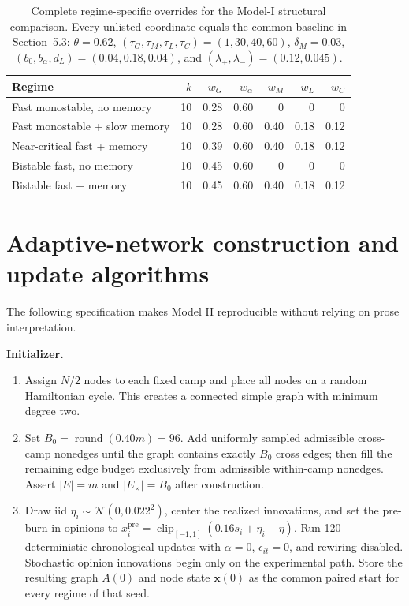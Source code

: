 \documentclass[10pt,a4paper]{article}
\newcommand{\inlinehead}[1]{\par\smallskip\noindent\textbf{#1}\ }
\begin{document}
\begin{appendices}
\begin{table}[!htbp]
\centering
\caption{Complete regime-specific overrides for the Model-I structural comparison. Every unlisted coordinate equals the common baseline in Section~5.3: $\theta=0.62$, $(\tau_G,\tau_M,\tau_L,\tau_C)=(1,30,40,60)$, $\delta_M=0.03$, $(b_0,b_\alpha,d_L)=(0.04,0.18,0.04)$, and $(\lambda_+,\lambda_-)=(0.12,0.045)$.}
\label{tab:model-i-regime-parameters}
\footnotesize
\setlength{\tabcolsep}{3pt}
\begin{tabular}{|p{4.0cm}|r|r|r|r|r|r|}
\hline
\textbf{Regime} & $k$ & $w_G$ & $w_\alpha$ & $w_M$ & $w_L$ & $w_C$\\
\hline
Fast monostable, no memory & 10 & 0.28 & 0.60 & 0 & 0 & 0\\
\hline
Fast monostable + slow memory & 10 & 0.28 & 0.60 & 0.40 & 0.18 & 0.12\\
\hline
Near-critical fast + memory & 10 & 0.39 & 0.60 & 0.40 & 0.18 & 0.12\\
\hline
Bistable fast, no memory & 10 & 0.45 & 0.60 & 0 & 0 & 0\\
\hline
Bistable fast + memory & 10 & 0.45 & 0.60 & 0.40 & 0.18 & 0.12\\
\hline
\end{tabular}
\end{table}

\section{Adaptive-network construction and update algorithms}

The following specification makes Model II reproducible without relying on prose interpretation.

\inlinehead{Initializer.}
\begin{enumerate}
  \item Assign $N/2$ nodes to each fixed camp and place all nodes on a random Hamiltonian cycle. This creates a connected simple graph with minimum degree two.
  \item Set $B_0=\operatorname{round}(0.40m)=96$. Add uniformly sampled admissible cross-camp nonedges until the graph contains exactly $B_0$ cross edges; then fill the remaining edge budget exclusively from admissible within-camp nonedges. Assert $|E|=m$ and $|E_\times|=B_0$ after construction.
  \item Draw iid $\eta_i\sim\mathcal N(0,0.022^2)$, center the realized innovations, and set the pre-burn-in opinions to $x_i^{\mathrm{pre}}=\operatorname{clip}_{[-1,1]}(0.16s_i+\eta_i-\bar\eta)$. Run 120 deterministic chronological updates with $\alpha=0$, $\epsilon_{it}=0$, and rewiring disabled. Stochastic opinion innovations begin only on the experimental path. Store the resulting graph $A(0)$ and node state $\bm x(0)$ as the common paired start for every regime of that seed.
\end{enumerate}


\end{appendices}
\end{document}
